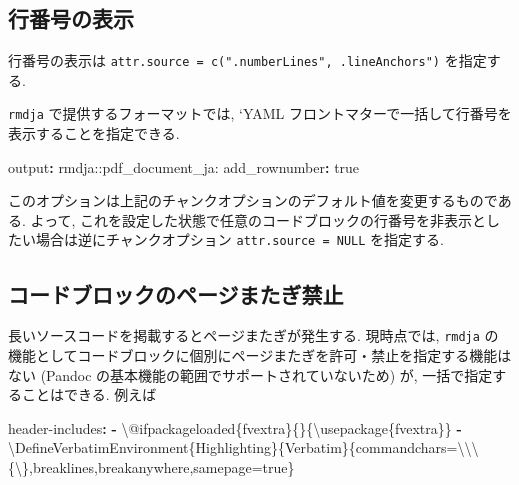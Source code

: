 \documentclass[
]{bxjsbook}
\newenvironment{Shaded}{\begin{snugshade}}{\end{snugshade}}
\newcommand{\AttributeTok}[1]{\textcolor[rgb]{0.77,0.63,0.00}{#1}}
\newcommand{\CharTok}[1]{\textcolor[rgb]{0.31,0.60,0.02}{#1}}
\newcommand{\FunctionTok}[1]{\textcolor[rgb]{0.00,0.00,0.00}{#1}}
\newcommand{\KeywordTok}[1]{\textcolor[rgb]{0.13,0.29,0.53}{\textbf{#1}}}
\theoremstyle{definition}
\theoremstyle{definition}
\theoremstyle{definition}
\theoremstyle{remark}
\begin{document}
\hypertarget{ux884cux756aux53f7ux306eux8868ux793a}{%
\subsection{行番号の表示}\label{ux884cux756aux53f7ux306eux8868ux793a}}

行番号の表示は
\texttt{attr.source\ =\ c(".numberLines",\ .lineAnchors")} を指定する.

\texttt{rmdja} で提供するフォーマットでは, `YAML
フロントマターで一括して行番号を表示することを指定できる.

\begin{Shaded}
\begin{Highlighting}[]
\FunctionTok{output}\KeywordTok{:}\AttributeTok{ rmdja::pdf\_document\_ja:}
\AttributeTok{  }\FunctionTok{add\_rownumber}\KeywordTok{:}\AttributeTok{ }\CharTok{true}
\end{Highlighting}
\end{Shaded}

このオプションは上記のチャンクオプションのデフォルト値を変更するものである.
よって,
これを設定した状態で任意のコードブロックの行番号を非表示としたい場合は逆にチャンクオプション
\texttt{attr.source\ =\ NULL} を指定する.

\hypertarget{ux30b3ux30fcux30c9ux30d6ux30edux30c3ux30afux306eux30daux30fcux30b8ux307eux305fux304eux7981ux6b62}{%
\subsection{コードブロックのページまたぎ禁止}\label{ux30b3ux30fcux30c9ux30d6ux30edux30c3ux30afux306eux30daux30fcux30b8ux307eux305fux304eux7981ux6b62}}

長いソースコードを掲載するとページまたぎが発生する. 現時点では,
\texttt{rmdja}
の機能としてコードブロックに個別にページまたぎを許可・禁止を指定する機能はない
(Pandoc の基本機能の範囲でサポートされていないため) が,
一括で指定することはできる. 例えば

\begin{Shaded}
\begin{Highlighting}[]
\FunctionTok{header{-}includes}\KeywordTok{:}
\AttributeTok{  }\KeywordTok{{-}}\AttributeTok{ \textbackslash{}@ifpackageloaded\{fvextra\}\{\}\{\textbackslash{}usepackage\{fvextra\}\}}
\AttributeTok{  }\KeywordTok{{-}}\AttributeTok{ \textbackslash{}DefineVerbatimEnvironment\{Highlighting\}\{Verbatim\}\{commandchars=\textbackslash{}\textbackslash{}\textbackslash{}\{\textbackslash{}\},breaklines,breakanywhere,samepage=true\}}
\end{Highlighting}
\end{Shaded}
\end{document}
